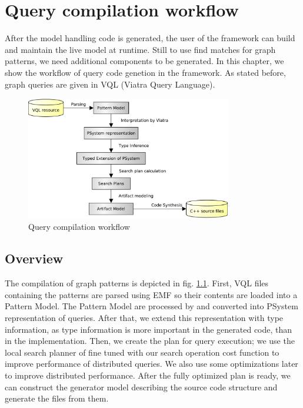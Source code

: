 

\chapter{Query compilation workflow}

After the model handling code is generated, the user of the framework can build and maintain the live model at runtime. 
Still to use find matches for graph patterns, we need additional components to be generated. 
In this chapter, we show the workflow of query code genetion in the framework. 
As stated before, graph queries are given in VQL (Viatra Query Language).


\begin{figure}[H]
	\begin{center}
		\includegraphics[width=0.8\textwidth]{figures/query-compilation-workflow.pdf}
		\caption{Query compilation workflow}
		\label{figure:query-compile-workflow}
	\end{center}
\end{figure}


\section{Overview}

The compilation of graph patterns is depicted in fig. \ref{figure:query-compile-workflow}. 
First, VQL files containing the patterns are parsed using EMF so their contents are loaded into a Pattern Model.
The Pattern Model are processed by \viatra{} and converted into PSystem representation of queries.
After that, we extend this representation with type information, as type information is more important in the \cpp{} generated code, than in the \viatra{} implementation.
Then, we create the plan for query execution; we use the local search planner of \viatra{} fine tuned with our search operation cost function to improve performance of distributed queries. 
We also use some optimizations later to improve distributed performance. 
After the fully optimized plan is ready, we can construct the generator model describing the source code structure and generate the \cpp{} files from them.




